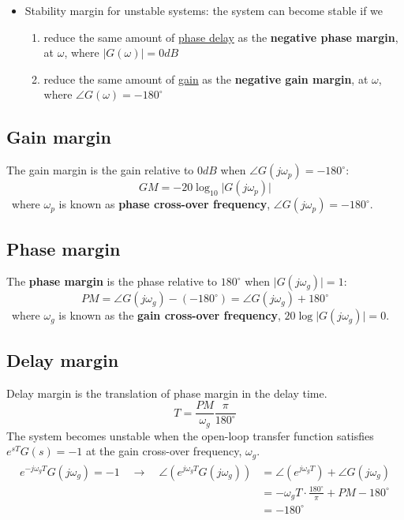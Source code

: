 \documentclass[12pt,a4paper]{article}
\begin{document}
\begin{itemize}
\begin{itemize}
\item Stability margin for unstable systems: the system can become stable if we 
\begin{enumerate}
\item reduce the same amount of \underline{phase delay} as the \textbf{negative phase margin}, at $\omega$, where $\lvert G(\omega)\rvert=0dB$
\item reduce the same amount of \underline{gain} as the \textbf{negative gain margin}, at $\omega$, where $\angle G(\omega)=-180^{\circ}$
\end{enumerate}
\end{itemize}
\end{itemize}


\subsection{Gain margin}
The gain margin is the gain relative to $0dB$ when $\angle G(j\omega_{p}) = -180^{\circ}$:
 \[ GM = -20\log_{10}\lvert G(j\omega_{p})\rvert\]
 \ where $\omega_{p}$ is known as \textbf{phase cross-over frequency}, $\angle G(j\omega_{p}) = -180^{\circ}$. 

\subsection{Phase margin}
The \textbf{phase margin} is the phase relative to $180^{\circ}$ when $\lvert G(j\omega_{g}) \rvert =1$:
\[ PM = \angle G(j\omega_{g})-(-180^{\circ}) =\angle G(j\omega_{g})+ 180^{\circ}\] 
\ where $\omega_{g}$ is known as the \textbf{gain cross-over frequency}, $20\log \lvert G(j\omega_{g})\rvert = 0$.

\subsection{Delay margin}
Delay margin is the translation of phase margin in the delay time.
\[T = \frac{PM}{\omega_{g}}\frac{\pi}{180^{\circ}}\]
The system becomes unstable when the open-loop transfer function satisfies $e^{sT}G(s) = -1$ at the gain cross-over frequency, $\omega_{g}$.
\begin{align*}
\begin{split}
e^{-j\omega_{g}T}G(j\omega_{g})=-1
\quad \longrightarrow \quad 
 \angle (e^{j\omega_{g}T} G(j\omega_{g}))&= \angle (e^{j\omega_{g}T})+\angle G(j\omega_{g}) \\
&= -\omega_{g}T\cdot \frac{180^{\circ}}{\pi}+PM-180^{\circ} \\
&= -180^{\circ}
\end{split}
\end{align*}
\newpage
\end{document}
